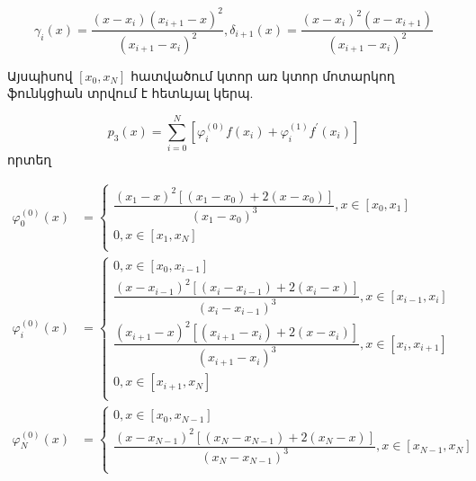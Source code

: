 \documentclass[fleqn, bachelor,subf,12pt,notitlepage]{article}
\begin{document}
\begin{equation}\gamma_{i}(x)=\dfrac{\left(x-x_{i}\right)\left(x_{i+1}-x\right)^{2}}{\left(x_{i+1}-x_{i}\right)^{2}}, \delta_{i+1}(x)=\dfrac{\left(x-x_{i}\right)^2\left(x-x_{i+1}\right)}{\left(x_{i+1}-x_{i}\right)^{2}}
\end{equation}

Այսպիսով $\left[x_{0}, x_{N}\right]$ հատվածում կտոր առ կտոր մոտարկող ֆունկցիան տրվում է հետևյալ կերպ.

\begin{equation}
p_{3}(x)=\sum_{i=0}^{N}\left[\varphi_{i}^{(0)}f(x_{i})+\varphi_{i}^{(1)}f^{'}(x_{i})\right]
\end{equation}
որտեղ 

\begin{equation}
\begin{aligned}
\varphi^{(0)}_{0}\left(x\right)&=\begin{cases}
\dfrac{\left(x_{1}-x\right)^{2}\left[\left(x_{1}-x_{0}\right)+2\left(x-x_{0}\right)\right]}{\left(x_{1}-x_{0}\right)^{3}},  x\in \left[x_{0}, x_{1}\right]\\
0, x\in \left[x_{1}, x_{N}\right]\\
\end{cases}\\
\varphi^{(0)}_{i}\left(x\right)&=\begin{cases}
0, x\in \left[x_{0}, x_{i-1}\right]\\
\dfrac{\left(x-x_{i-1}\right)^{2}\left[\left(x_{i}-x_{i-1}\right)+2\left(x_{i}-x\right)\right]}{\left(x_{i}-x_{i-1}\right)^{3}}, x\in \left[x_{i-1}, x_{i}\right]\\
\dfrac{\left(x_{i+1}-x\right)^{2}\left[\left(x_{i+1}-x_{i}\right)+2\left(x-x_{i}\right)\right]}{\left(x_{i+1}-x_{i}\right)^{3}}, x\in \left[x_{i}, x_{i+1}\right]\\
0, x\in \left[x_{i+1}, x_{N}\right]\\
\end{cases}\\
\varphi^{(0)}_{N}\left(x\right)&=\begin{cases}
0, x\in \left[x_{0}, x_{N-1}\right]\\
\dfrac{\left(x-x_{N-1}\right)^{2}\left[\left(x_{N}-x_{N-1}\right)+2\left(x_{N}-x\right)\right]}{\left(x_{N}-x_{N-1}\right)^{3}}, x\in \left[x_{N-1}, x_{N}\right]\\
\end{cases}
\end{aligned}
\end{equation}
\end{document}
